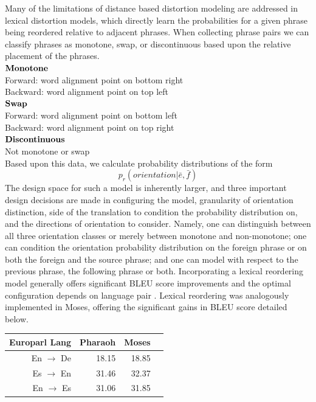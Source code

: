 \documentclass[11pt]{report}
\theoremstyle{plain}
\begin{document}
{Many of the limitations of distance based distortion modeling are addressed in lexical distortion models\cite{tillmann:04, koehn:05}, which directly learn the probabilities for a given phrase being reordered relative to adjacent phrases. When collecting phrase pairs we can classify phrases as monotone, swap, or discontinuous based upon the relative placement of the phrases.\\
\indent $\bf{Monotone}$\\
\indent \indent Forward: word alignment point on bottom right\\
\indent \indent Backward: word alignment point on top left\\
\indent $\bf{Swap}$\\
\indent \indent Forward: word alignment point on bottom left\\
\indent \indent Backward: word alignment point on top right\\
\indent $\bf{Discontinuous}$\\
\indent \indent Not monotone or swap\\
Based upon this data, we calculate probability distributions of the form 
\begin{equation}
p_r(orientation|\bar{e},\bar{f})
\end{equation}
The design space for such a model is inherently larger, and three important design decisions are made in configuring the model, granularity of orientation distinction, side of the translation to condition the probability distribution on, and the directions of orientation to consider. Namely, one can distinguish between all three orientation classes or merely between monotone and non-monotone; one can condition the orientation probability distribution on the foreign phrase or on both the foreign and the source phrase; and one can model with respect to the previous phrase, the following phrase or both. Incorporating a lexical reordering model generally offers significant BLEU score improvements and the optimal configuration depends on language pair \cite{koehn:05}. Lexical reordering was analogously implemented in Moses, offering the significant gains in BLEU score detailed below.\\

\begin{tabular}{r|rrr}
Europarl Lang & Pharaoh & Moses\\ 
\hline
 En $\rightarrow$ De & 18.15 &18.85 \\ 
Es $\rightarrow$ En & 31.46 & 32.37 \\
En $\rightarrow$ Es &  31.06 & 31.85 \\
\end{tabular}
}
\end{document}
